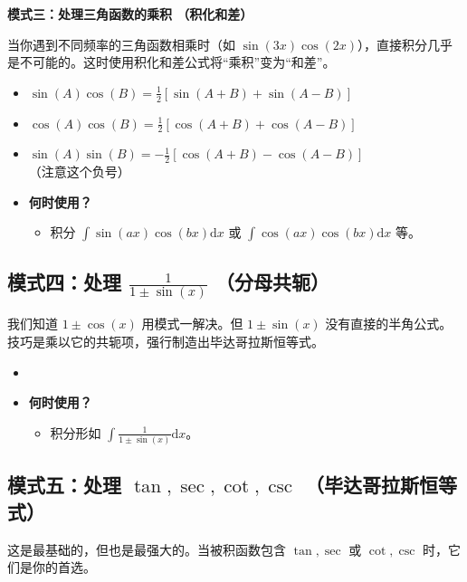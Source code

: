 \documentclass[lang=cn,math=mtpro2,11pt,scheme=chinese]{elegantbook}
\begin{document}
\textbf{\large 模式三：处理三角函数的乘积 （积化和差）}

当你遇到不同频率的三角函数相乘时（如 $\sin(3x)\cos(2x)$），直接积分几乎是不可能的。这时使用积化和差公式将“乘积”变为“和差”。

\begin{itemize}
  \item $\sin(A)\cos(B) = \frac{1}{2}[\sin(A+B) + \sin(A-B)]$
  \item $\cos(A)\cos(B) = \frac{1}{2}[\cos(A+B) + \cos(A-B)]$
  \item $\sin(A)\sin(B) = -\frac{1}{2}[\cos(A+B) - \cos(A-B)]$（注意这个负号）
  \item \textbf{何时使用？}
  \begin{itemize}
    \item 积分 $\int \sin(ax)\cos(bx) \mathrm{d}x$ 或 $\int \cos(ax)\cos(bx) \mathrm{d}x$ 等。
  \end{itemize}
\end{itemize}
\vspace{3em}

\subsection{模式四：处理 $\frac{1}{1 \pm \sin(x)}$ （分母共轭）}

我们知道 $1 \pm \cos(x)$ 用模式一解决。但 $1 \pm \sin(x)$ 没有直接的半角公式。技巧是乘以它的共轭项，强行制造出毕达哥拉斯恒等式。

\begin{itemize}
  \item 
  \item \textbf{何时使用？}
  \begin{itemize}
    \item 积分形如 $\int \frac{1}{1 \pm \sin(x)} \mathrm{d}x$。
  \end{itemize}
\end{itemize}
\vspace{3em}

\subsection{模式五：处理 $\tan, \sec, \cot, \csc$ （毕达哥拉斯恒等式）}

这是最基础的，但也是最强大的。当被积函数包含 $\tan, \sec$ 或 $\cot, \csc$ 时，它们是你的首选。
\end{document}
